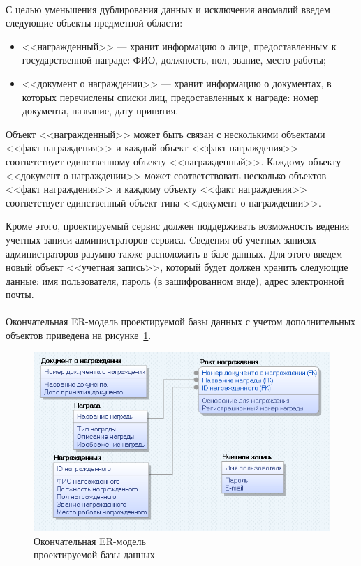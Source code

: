 \paragraph{}
С целью уменьшения дублирования данных и исключения аномалий введем
следующие объекты предметной области:

\begin{itemize}
\item <<награжденный>> --- хранит информацию о лице, предоставленным
  к государственной награде: ФИО, должность, пол, звание, место работы;
\item <<документ о награждении>> --- хранит информацию о документах,
  в которых перечислены списки лиц, предоставленных к награде: номер документа,
  название, дату принятия.
\end{itemize}

Объект <<награжденный>> может быть связан с несколькими
объектами <<факт награждения>> и каждый объект <<факт награждения>> 
соответствует единственному объекту <<награжденный>>.
Каждому объекту <<документ о награждении>> может соответствовать несколько
объектов <<факт награждения>> и каждому объекту <<факт награждения>> 
соответствует единственный объект типа <<документ о награждении>>.

Кроме этого, проектируемый сервис должен поддерживать возможность ведения
учетных записи администраторов сервиса.
Cведения об учетных записях администраторов разумно также
расположить в базе данных. Для этого введем новый объект <<учетная запись>>,
который будет должен хранить следующие данные:
имя пользователя, пароль (в зашифрованном виде), адрес электронной почты.

\paragraph{}
Окончательная ER-модель проектируемой базы данных с учетом
дополнительных объектов приведена
на рисунке~\ref{fig:er_final}.

\begin{figure}[h]
  \centering
  \includegraphics[width=130mm]{pic/er_final.png}
  \caption{Окончательная ER-модель \\ проектируемой базы данных}
  \label{fig:er_final}
\end{figure}

